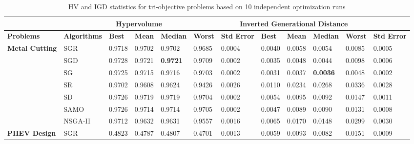 \begin{table*}[!htb]\scriptsize
	\centering
	\caption{HV and IGD statistics for tri-objective problems based on 10 independent optimization runs}
	\begin{tabular}{|l|l|l|l|l|l|l|l|l|l|l|l|}
		\noalign{\smallskip}\hline
		\multicolumn{2}{|c|}{} & \multicolumn{5}{|c|}{\textbf{Hypervolume}} & \multicolumn{5}{|c|}{\textbf{Inverted Generational Distance}}\\ \hline
		\textbf{Problems}            & \textbf{Algorithms} & \textbf{Best} & \textbf{Mean} & \textbf{Median} & \textbf{Worst} & \textbf{Std Error} & \textbf{Best} & \textbf{Mean} & \textbf{Median} & \textbf{Worst} & \textbf{Std Error}\\ \hline
		\multirow{7}{*}{\textbf{Metal Cutting}}                             & SGR                 & 0.9718        & 0.9702        & 0.9702          & 0.9685         & 0.0004       & 0.0040        & 0.0058        & 0.0054          & 0.0085         & 0.0005                   \\ 
		& SGD                 & 0.9728        & 0.9721        & \textbf{0.9721}          & 0.9709         & 0.0002           & 0.0035        & 0.0048        & 0.0044          & 0.0098         & 0.0006                    \\ 
		& SG                  & 0.9725        & 0.9715        & 0.9716          & 0.9703         & 0.0002              & 0.0031        & 0.0037        & \textbf{0.0036}          & 0.0048         & 0.0002            \\ 
		& SR                  & 0.9702        & 0.9608        & 0.9624          & 0.9426         & 0.0026        & 0.0110        & 0.0234        & 0.0268          & 0.0336         & 0.0028               \\ 
		& SD                  & 0.9726        & 0.9719        & 0.9719          & 0.9704         & 0.0002         & 0.0054        & 0.0095        & 0.0092          & 0.0147         & 0.0011               \\ 
		& SAMO                & 0.9726        & 0.9714        & 0.9714          & 0.9705         & 0.0002        & 0.0047        & 0.0089        & 0.0090          & 0.0131         & 0.0008               \\ 
		& NSGA-II             & 0.9712        & 0.9632        & 0.9631          & 0.9557         & 0.0016            & 0.0065        & 0.0170        & 0.0148          & 0.0299         & 0.0030               \\ \hline
		\multirow{7}{*}{\textbf{PHEV Design}}                            & SGR                 & 0.4823         & 0.4787         & 0.4807           & 0.4701          & 0.0013        & 0.0059         & 0.0093         & 0.0082           & 0.0151          & 0.0009                   \\ 

\end{tabular}
\end{table*}
